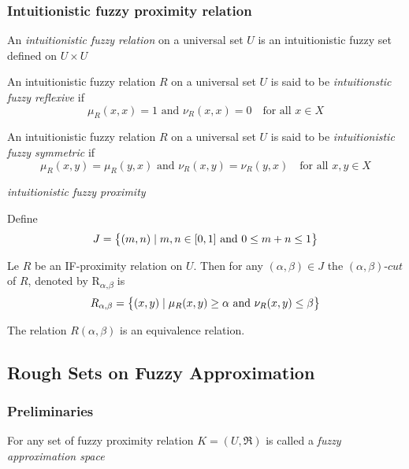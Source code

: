 \documentclass[11pt]{article}
\begin{document}
\subsubsection{Intuitionistic fuzzy proximity relation}
\label{sec:org71dcdd7}
\begin{definition}[]
An \emph{intuitionistic fuzzy relation} on a universal set \(U\) is an intuitionistic
fuzzy set defined on \(U\times U\)
\end{definition}
\begin{definition}[]
An intuitionistic fuzzy relation \(R\) on a universal set \(U\) is said to be 
\emph{intuitionstic fuzzy reflexive} if 
\begin{equation*}
\mu_R(x,x)=1\text{ and } \nu_R(x,x)=0\quad\text{for all } x\in X
\end{equation*}
\end{definition}
\begin{definition}[]
An intuitionistic fuzzy relation \(R\) on a universal set \(U\) is said to be 
\emph{intuitionistic fuzzy symmetric} if
\begin{equation*}
\mu_R(x,y)=\mu_R(y,x)\text{ and } \nu_R(x,y)=\nu_R(y,x)\quad\text{for all } x,y\in X
\end{equation*}
\end{definition}
\begin{definition}[]
\emph{intuitionistic fuzzy proximity}
\end{definition}
Define
\begin{equation*}
J=\left\{(m,n)\mid m,n\in[0,1] \text{ and } 0\le m+n\le 1\right\}
\end{equation*}
\begin{definition}[]
Le \(R\) be an IF-proximity relation on \(U\). Then for any \((\alpha,\beta)\in J\) the 
\((\alpha,\beta)\textit{-cut}\) of \(R\), denoted by R\textsubscript{\(\alpha\),\(\beta\)} is 
\begin{equation*}
R_{\alpha,\beta}=\left\{(x,y)\mid\mu_R(x,y)\ge\alpha\text{ and } \nu_R(x,y)\le\beta\right\}
\end{equation*}
\end{definition}
The relation \(R(\alpha,\beta)\) is an equivalence relation.
\subsection{Rough Sets on Fuzzy Approximation}
\label{sec:org819aafb}
\subsubsection{Preliminaries}
\label{sec:org76150a6}
\begin{definition}[]
For any set of fuzzy proximity relation \(K=(U,\mathfrak{R})\) is called a
\emph{fuzzy approximation space}
\end{definition}
\end{document}
